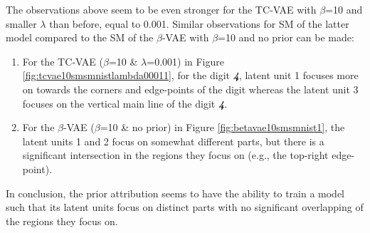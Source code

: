 The observations above seem to be even stronger for the TC‐VAE with $\beta$=10  and smaller $\lambda$ than before, equal to 0.001. Similar observations for SM of the latter model compared to the SM of the $\beta$-VAE with $\beta$=10 and no prior can be made:
\begin{enumerate}[labelindent=\parindent,leftmargin=*, topsep=0pt]
\itemsep0em
    \item\label{qualprior:obs1} For the TC‐VAE ($\beta$=10  \& $\lambda$=0.001) in Figure \ref{fig:tcvae10smsmnistlambda00011}, for the digit \textbf{\textit{4}}, latent unit 1 focuses more on towards the corners and edge-points of the digit
    whereas the latent unit 3 focuses on the vertical main line of the digit \textbf{\textit{4}}. 
    \item\label{qualprior:obs2} For the $\beta$-VAE ($\beta$=10 \& no prior) in Figure \ref{fig:betavae10smsmnist1}, the latent units 1 and 2 focus on somewhat different parts, but there is a significant intersection in the regions they focus on (e.g., the top-right edge-point). 
\end{enumerate}

\bigskip

In conclusion, the prior attribution seems to have the ability to train a model such that its latent units focus on distinct parts with no significant overlapping of the regions they focus on.

